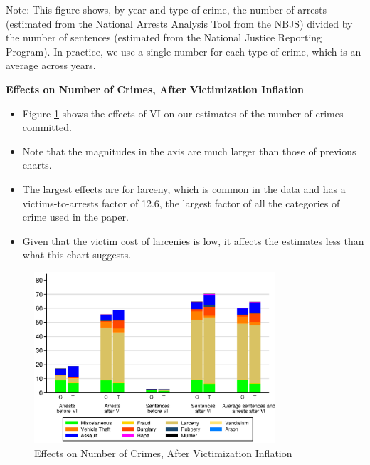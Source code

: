 \documentclass[static]{JJH-Beamer}
\begin{document}
{\flushleft \normalsize Note: This figure shows, by year and type of crime, the number of arrests (estimated from the National Arrests Analysis Tool from the NBJS) divided by the number of sentences (estimated from the National Justice Reporting Program). In practice, we use a single number for each type of crime, which is an average across years.\\}

\begin{frame}

\begin{center}
\textbf{Effects on Number of Crimes, After Victimization Inflation}
\end{center}
\begin{itemize}
\item Figure \ref{fig:count-vi} shows the effects of VI on our estimates of the number of crimes committed.
\item Note that the magnitudes in the axis are much larger than those of previous charts.
\item The largest effects are for larceny, which is common in the data and has a victims-to-arrests factor of 12.6, the largest factor of all the categories of crime used in the paper.
\item Given that the victim cost of larcenies is low, it affects the estimates less than what this chart suggests.
\end{itemize}

\end{frame}

\begin{frame}

\begin{figure}[H]
\caption{Effects on Number of Crimes, After Victimization Inflation}\label{fig:count-vi}
\begin{center}
\includegraphics[width=0.8\textwidth]{AppOutput/Crime/vi}
\end{center}
\end{figure}

\end{frame}
\end{document}

